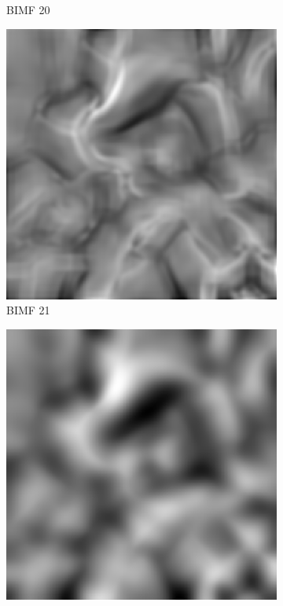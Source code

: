 \begin{figure}
\begin{subfigure}{.30\textwidth}
  \caption{BIMF 20}
\end{subfigure}
\begin{subfigure}{.30\textwidth}
  \centering
  \includegraphics[width=.9\linewidth]{img/e_1_1_21}
  \caption{BIMF 21}
\end{subfigure}
\begin{subfigure}{.30\textwidth}
  \centering
  \includegraphics[width=.9\linewidth]{img/e_1_1_22}

\end{subfigure}
\end{figure}
